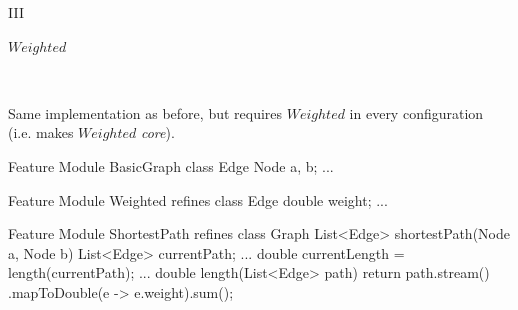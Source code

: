 \begin{frame}[fragile]{\myframetitle{} III}
	\begin{fancycolumns}[animation=none]
		\centering
		
		\textcolor{lecturegreen}{$Weighted$}
		
		~
		\begin{note}{}
			Same implementation as before, but requires $Weighted$ in every configuration\\
			(i.e. makes $Weighted$ \textit{core}).
		\end{note}
		\nextcolumn
\begin{codetight}{Feature Module BasicGraph}
	class Edge { Node a, b; ... }
\end{codetight}	
\begin{codetight}{Feature Module Weighted}
	refines class Edge { double weight; ... }
\end{codetight}	
\begin{codetight}{Feature Module ShortestPath}
	refines class Graph {
		List<Edge> shortestPath(Node a, Node b){
			List<Edge> currentPath;
			... 
			double currentLength = length(currentPath);
			... 
		}
		double length(List<Edge> path) {
			return path.stream()
			.mapToDouble(e -> e.weight).sum();
		}
	}
\end{codetight}	
	\end{fancycolumns}
\end{frame}

